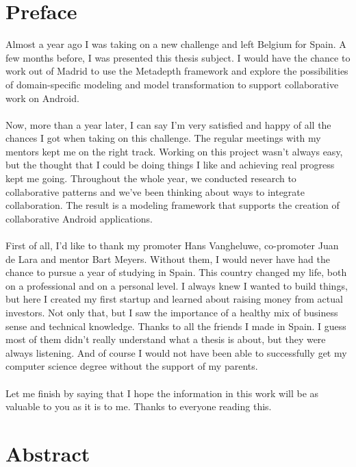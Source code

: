 \chapter*{Preface}

Almost a year ago I was taking on a new challenge and left Belgium for Spain. A few months before, I was presented this thesis subject. I would have the chance to work out of Madrid to use the Metadepth framework and explore the possibilities of domain-specific modeling and model transformation to support collaborative work on Android. \\ \\
Now, more than a year later, I can say I'm very satisfied and happy of all the chances I got when taking on this challenge. The regular meetings with my mentors kept me on the right track. Working on this project wasn't always easy, but the thought that I could be doing things I like and achieving real progress kept me going. Throughout the whole year, we conducted research to collaborative patterns and we've been thinking about ways to integrate collaboration. The result is a modeling framework that supports the creation of collaborative Android applications.   \\ \\
First of all, I'd like to thank my promoter Hans Vangheluwe, co-promoter Juan de Lara and mentor Bart Meyers. Without them, I would never have had the chance to pursue a year of studying in Spain. This country changed my life, both on a professional and on a personal level. I always knew I wanted to build things, but here I created my first startup and learned about raising money from actual investors. Not only that, but I saw the importance of a healthy mix of business sense and technical knowledge. Thanks to all the friends I made in Spain. I guess most of them didn't really understand what a thesis is about, but they were always listening. And of course I would not have been able to successfully get my computer science degree without the support of my parents. \\ \\ 
Let me finish by saying that I hope the information in this work will be as valuable to you as it is to me. Thanks to everyone reading this.

\chapter*{Abstract}

